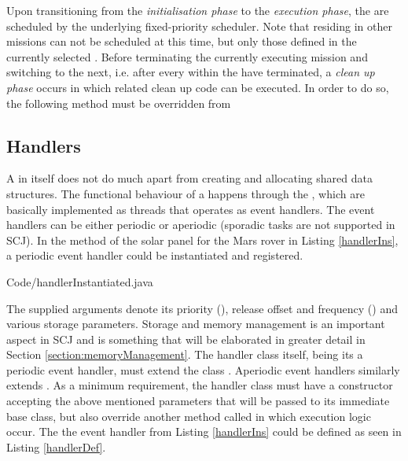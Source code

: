 Upon transitioning from the \textit{initialisation phase} to the \textit{execution phase}, the  are scheduled by the underlying fixed-priority scheduler. Note that  residing in other missions can not be scheduled at this time, but only those defined in the currently selected . Before terminating the currently executing mission and switching to the next, i.e. after every  within the  have terminated, a \textit{clean up phase} occurs in which  related clean up code can be executed. In order to do so, the following method must be overridden from 

\begin{quotation}
\end{quotation}

\subsection{Handlers}
\label{subsection:handlers}
A  in itself does not do much apart from creating  and allocating shared data structures. The functional behaviour of a  happens through the , which are basically implemented as threads that operates as event handlers. The event handlers can be either periodic or aperiodic (sporadic tasks are not supported in SCJ). In the  method of the solar panel  for the Mars rover in Listing \ref{handlerIns}, a periodic event handler could be instantiated and registered.


{Code/handlerInstantiated.java}

The supplied arguments denote its priority (), release offset and frequency () and various storage parameters. Storage and memory management is an important aspect in SCJ and is something that will be elaborated in greater detail in Section \ref{section:memoryManagement}. The handler class itself, being its a periodic event handler, must extend the class . Aperiodic event handlers similarly extends . As a minimum requirement, the handler class must have a constructor accepting the above mentioned parameters that will be passed to its immediate base class, but also override another method called  in which execution logic occur. The the event handler from Listing \ref{handlerIns} could be defined as seen in Listing \ref{handlerDef}.

